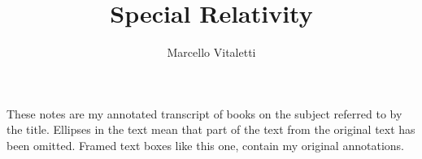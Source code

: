 \documentclass[english, 11pt]{book}
\begin{document}

\newcommand{\quotes}[1]{``#1''}
\newcommand{\sfT}{$\mathsf{T}$}
\newcommand{\udT}{\rotatebox[origin=c]{180}{$\mathsf{T}$}}


\newcommand{\N}{\mathbb{N}}	%
\newcommand{\Z}{\mathbb{Z}}	%
\newcommand{\Q}{\mathbb{Q}}	%
\newcommand{\R}{\mathbb{R}}	%
\newcommand{\C}{\mathbb{C}}	%
\newcommand{\F}{\mathbb{F}}	%
\newcommand{\K}{\mathbb{K}}	%

\newcommand{\U}{\mathcal{U}}    %
\newcommand{\V}{\mathcal{V}}    %
\newcommand{\W}{\mathcal{W}}    %

\newcommand{\hatvb}[1]{\vb{\hat{#1}}}
\newcommand{\chkvb}[1]{\vb{\check{#1}}}

\newcommand{\hatv}[1]{\hat{#1}}
\newcommand{\chkv}[1]{\check{#1}}

\newcommand{\hbra}[1]{\bra*{\hat{#1}}}
\newcommand{\hket}[1]{\ket*{\hat{#1}}}

\newcommand{\ut}[1]{\underaccent{\tilde}{#1}}
\newcommand{\uh}[1]{\underaccent{\hat}{#1}}
\newcommand{\form}[1]{\uh{#1}}

\newcommand{\tit}[1]{\textit{#1}}
\newcommand{\tbf}[1]{\textbf{#1}}
\newcommand{\tbi}[1]{\textit{\textbf{#1}}}

\DeclareRobustCommand{\rchi}{{\mathpalette\irchi\relax}}
\newcommand{\irchi}[2]{\raisebox{\depth}{$#1\chi$}} %




\author{Marcello Vitaletti}
\title{Special Relativity\\
{\small }}
\maketitle
\begin{mdframed}[leftmargin=-10pt,rightmargin=-10pt]
These notes are my annotated transcript of books on the subject referred to by the title. Ellipses in the text mean that part of the text from the original text has been omitted. Framed text boxes like this one, contain my original annotations.
\end{mdframed}
\end{document}
